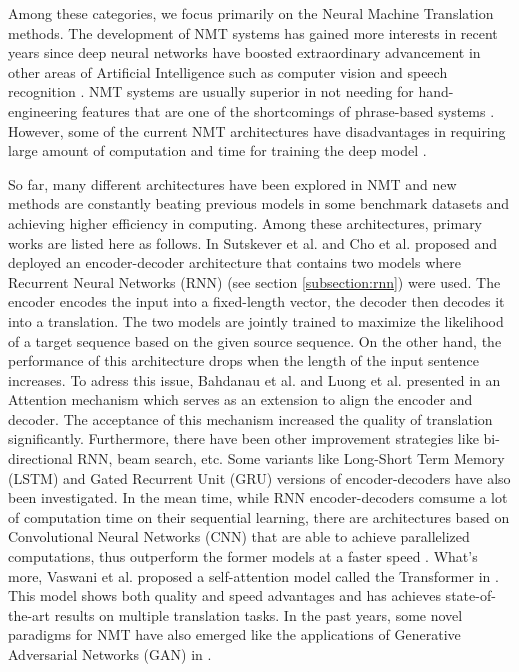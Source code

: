 Among these categories, we focus primarily on the Neural Machine Translation methods. The development of NMT systems has gained more interests in recent years since deep neural networks have boosted extraordinary advancement in other areas of Artificial Intelligence such as computer vision \cite{krizhevsky2012imagenet} and speech recognition \cite{dahl2012context}. NMT systems are usually superior in not needing for hand-engineering features that are one of the shortcomings of phrase-based systems \cite{Britz2017}. However, some of the current NMT architectures have disadvantages in requiring large amount of computation and time for training the deep model \cite{Britz2017}.

So far, many different architectures have been explored in NMT and new methods are constantly beating previous models in some benchmark datasets and achieving higher efficiency in computing. Among these architectures, primary works are listed here as follows. In \cite{Sutskever2014,Cho2014} Sutskever et al. and Cho et al. proposed and deployed an encoder-decoder architecture that contains two models where Recurrent Neural Networks (RNN) (see section \ref{subsection:rnn}) were used. The encoder encodes the input into a fixed-length vector, the decoder then decodes it into a translation. The two models are jointly trained to maximize the likelihood of a target sequence based on the given source sequence. On the other hand, the performance of this architecture drops when the length of the input sentence increases. To adress this issue, Bahdanau et al. and Luong et al. presented in \cite{Bahdanau2014,Luong2015} an Attention mechanism which serves as an extension to align the encoder and decoder. The acceptance of this mechanism increased the quality of translation significantly. Furthermore, there have been other improvement strategies like bi-directional RNN, beam search, etc. Some variants like Long-Short Term Memory (LSTM) \cite{hochreiter1997long} and Gated Recurrent Unit (GRU) \cite{Cho2014} versions of encoder-decoders have also been investigated. In the mean time, while RNN encoder-decoders comsume a lot of computation time on their sequential learning, there are architectures based on Convolutional Neural Networks (CNN) that are able to achieve parallelized computations, thus outperform the former models at a faster speed \cite{Gehring2017}. What's more, Vaswani et al. proposed a self-attention model called the Transformer in \cite{Vaswani2017}. This model shows both quality and speed advantages and has achieves state-of-the-art results on multiple translation tasks. In the past years, some novel paradigms for NMT have also emerged like the applications of Generative Adversarial Networks (GAN) in \cite{wu2017adversarial,yang2017improving}.

